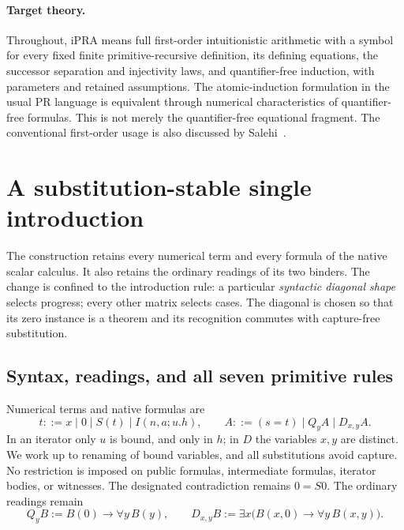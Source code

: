 \documentclass[11pt]{article}
\theoremstyle{definition}
\theoremstyle{remark}
\begin{document}
\paragraph{Target theory.}
Throughout, iPRA means full first-order intuitionistic arithmetic with a
symbol for every fixed finite primitive-recursive definition, its defining
equations, the successor separation and injectivity laws, and
quantifier-free induction, with parameters and retained assumptions.
The atomic-induction formulation in the usual PR language is equivalent
through numerical characteristics of quantifier-free formulas. This is
not merely the quantifier-free equational fragment. The conventional
first-order usage is also discussed by Salehi~\cite{salehi}.

\section{A substitution-stable single introduction}
\label{sec:diagonal-core}

The construction retains every numerical term and every formula of the
native scalar calculus.  It also retains the ordinary readings of its two
binders.  The change is confined to the introduction rule: a particular
\emph{syntactic diagonal shape} selects progress; every other matrix selects
cases.  The diagonal is chosen so that its zero instance is a theorem and
its recognition commutes with capture-free substitution.

\subsection{Syntax, readings, and all seven primitive rules}

Numerical terms and native formulas are
\[
 t ::= x\mid 0\mid S(t)\mid I(n,a;u.h),
 \qquad
 A ::= (s=t)\mid Q_y A\mid D_{x,y}A.
\]
In an iterator only $u$ is bound, and only in $h$; in $D$ the variables
$x,y$ are distinct.  We work up to renaming of bound variables, and all
substitutions avoid capture.  No restriction is imposed on public formulas,
intermediate formulas, iterator bodies, or witnesses.  The designated
contradiction remains $0=S0$.  The ordinary readings remain
\[
 Q_y B := B(0)\to\forall y\,B(y),\qquad
 D_{x,y}B := \exists x\bigl(B(x,0)\to\forall y\,B(x,y)\bigr).
\]
\end{document}
